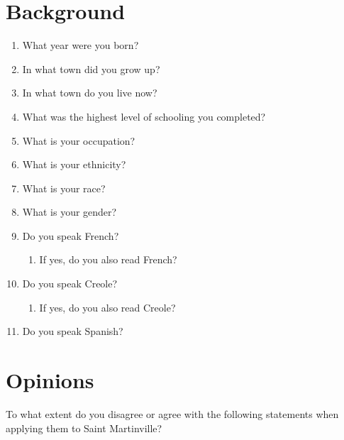 
  \section{Background}
    \begin{enumerate}
      \item What year were you born? \hrulefill
      \item In what town did you grow up? \hrulefill
      \item In what town do you live now? \hrulefill
      \item What was the highest level of schooling you completed? \hrulefill
      \item What is your occupation? \hrulefill
      \item What is your ethnicity? \hrulefill
      \item What is your race? \hrulefill
      \item What is your gender? \hrulefill
      \item Do you speak French? \hrulefill
      \begin{enumerate}
        \item If yes, do you also read French? \hrulefill
      \end{enumerate}
      \item Do you speak Creole? \hrulefill
      \begin{enumerate}
        \item If yes, do you also read Creole? \hrulefill
      \end{enumerate}
      \item Do you speak Spanish? \hrulefill
    \end{enumerate}

  \section{Opinions}
    \noindent To what extent do you disagree or agree with the following statements when applying them to Saint Martinville?

